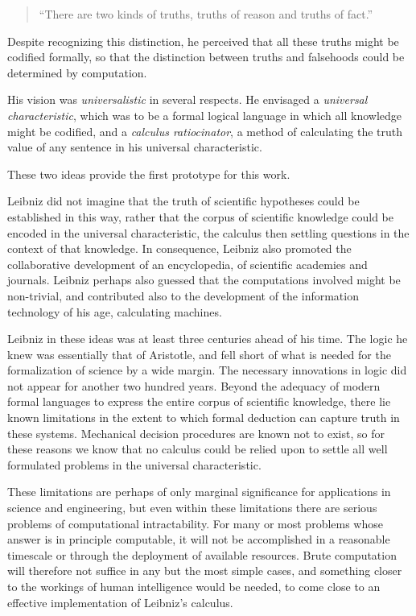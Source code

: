 \begin{quote}
``There are two kinds of truths, truths of reason and truths of fact.''
\end{quote}

Despite recognizing this distinction, he perceived that all these
truths might be codified formally, so that the distinction between
truths and falsehoods could be determined by computation. 

His vision was \emph{universalistic} in several respects.
He envisaged a \emph{universal
  characteristic}, which was to be a
formal logical language in which all knowledge might be codified, and
a \emph{calculus ratiocinator}, a method
of calculating the truth value of any sentence in his universal
characteristic. 

These two ideas provide the first prototype for this work.

Leibniz did not imagine that the truth of scientific hypotheses could
be established in this way, rather that the corpus of scientific
knowledge could be encoded in the universal characteristic, the
calculus then settling questions in the context of that knowledge. 
In consequence, Leibniz also promoted the collaborative development of
an encyclopedia, of scientific academies and journals. 
Leibniz perhaps also guessed that the computations involved might be
non-trivial, and contributed also to the development of the
information technology of his age, calculating machines. 

Leibniz in these ideas was at least three centuries ahead of his time.
The logic he knew was essentially that of Aristotle, and fell short of
what is needed for the formalization of science by a wide margin. 
The necessary innovations in logic did not appear for another two
hundred years. 
Beyond the adequacy of modern formal languages to express the entire
corpus of scientific knowledge, there lie known limitations in the
extent to which formal deduction can capture truth in these systems. 
Mechanical decision procedures are known not to exist, so for these
reasons we know that no calculus could be relied upon to settle all
well formulated problems in the universal characteristic. 

These limitations are perhaps of only marginal significance for
applications in science and engineering, but even within these
limitations there are serious problems of computational
intractability. 
For many or most problems whose answer is in principle computable, it
will not be accomplished in a reasonable timescale or through the
deployment of available resources. 
Brute computation will therefore not suffice in any but the most
simple cases, and something closer to the workings of human
intelligence would be needed, to come close to an effective
implementation of Leibniz's calculus. 

